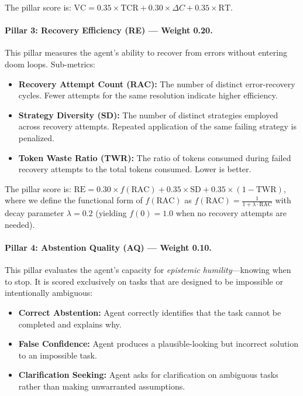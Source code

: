 \documentclass[letterpaper, 10 pt, conference]{ieeeconf}
\begin{document}
The pillar score is:
$\mathrm{VC} = 0.35 \times \mathrm{TCR} + 0.30 \times \Delta C + 0.35 \times \mathrm{RT}$.

\paragraph{Pillar 3: Recovery Efficiency (RE) --- Weight 0.20.}
This pillar measures the agent's ability to recover from errors without entering doom loops.
Sub-metrics:
\begin{itemize}[leftmargin=*,itemsep=1pt]
  \item \textbf{Recovery Attempt Count (RAC):} The number of distinct error-recovery cycles. Fewer attempts for the same resolution indicate higher efficiency.
  \item \textbf{Strategy Diversity (SD):} The number of distinct strategies employed across recovery attempts. Repeated application of the same failing strategy is penalized.
  \item \textbf{Token Waste Ratio (TWR):} The ratio of tokens consumed during failed recovery attempts to the total tokens consumed. Lower is better.
\end{itemize}

The pillar score is:
$\mathrm{RE} = 0.30 \times f(\mathrm{RAC}) + 0.35 \times \mathrm{SD} + 0.35 \times (1 - \mathrm{TWR})$,
where we define the functional form of $f(\mathrm{RAC})$ as $f(\mathrm{RAC}) = \frac{1}{1 + \lambda \cdot \mathrm{RAC}}$ with decay parameter $\lambda = 0.2$ (yielding $f(0) = 1.0$ when no recovery attempts are needed).

\paragraph{Pillar 4: Abstention Quality (AQ) --- Weight 0.10.}
This pillar evaluates the agent's capacity for \emph{epistemic humility}---knowing when to stop.
It is scored exclusively on tasks that are designed to be impossible or intentionally ambiguous:
\begin{itemize}[leftmargin=*,itemsep=1pt]
  \item \textbf{Correct Abstention:} Agent correctly identifies that the task cannot be completed and explains why.
  \item \textbf{False Confidence:} Agent produces a plausible-looking but incorrect solution to an impossible task.
  \item \textbf{Clarification Seeking:} Agent asks for clarification on ambiguous tasks rather than making unwarranted assumptions.
\end{itemize}
\end{document}
